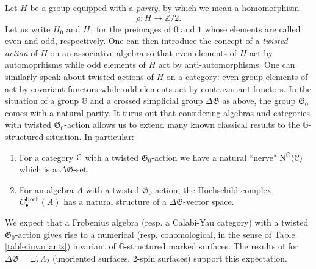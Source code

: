\documentclass[english,11pt,leqno]{article}
\def\GG{\mathbb{G}}
\def\ZZ{\mathbb{Z}}
\def\Gen{\mathfrak{G}}
\def\Aut{\operatorname{Aut}\nolimits}
\def\on{\operatorname}
\def\lra{\longrightarrow}
\def\N{\operatorname{N}}
\def\C{{\EuScript C}}
\def\DG{ {\Delta \Gen}}
\theoremstyle{definition}
\theoremstyle{remark}
\numberwithin{equation}{section}
\begin{document}
Let $H$ be a group equipped with a {\em parity}, by which we mean a homomorphism
\[
\rho: H \lra \ZZ/2.
\]
Let us write $H_{0}$ and $H_{1}$ for the preimages of $0$ and $1$ whose elements are called even and
odd, respectively. One can then introduce the concept of a {\em twisted action} of $H$ on an
associative algebra so that even elements of $H$ act by automoprhisms while odd elements of $H$ act
by anti-automorphisms. 
One can similarly speak about twisted actions of $H$ on a category: even group elements of 
act by covariant functors while odd elements act by contravariant functors. 
In the situation of a group $\GG$ and a crossed simplicial group $\Delta\Gen$ as above, the group
$\Gen_0$ comes with a natural parity. It turns out
that considering algebras and categories with twisted $\Gen_0$-action allows us to extend many
known classical results to the $\GG$-structured situation. In particular:

\begin{enumerate}
\item[(1)] For a category $\C$ with a twisted $\Gen_0$-action we have a natural ``nerve" $\N^\GG(\C)$ which
is a $\Delta\Gen$-set. 

\item[(2)] For an algebra $A$ with a twisted $\Gen_0$-action, the Hochschild complex $C_\bullet^{\on{Hoch}}(A)$
has a natural structure of a $\Delta\Gen$-vector space.

 
\end{enumerate}

We expect that a Frobenius algebra (resp. a  Calabi-Yau category) with a twisted $\Gen_0$-action
gives rise to a numerical (resp. cohomological, in the sense of Table \ref{table:invariants})
invariant of $\GG$-structured marked surfaces. The results of \cite{alex-natanzon, novak-runkel} for
$\DG=\Xi, \Lambda_2$ (unoriented surfaces, 2-spin surfaces) support this expectation.\\
 
\end{document}
